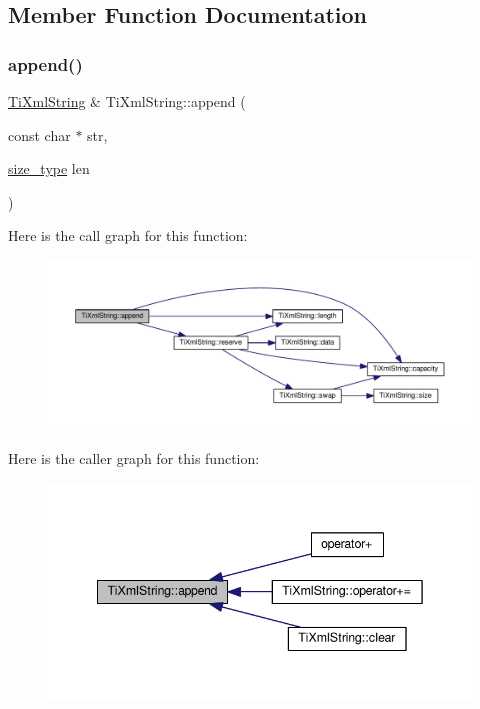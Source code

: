 \subsection{Member Function Documentation}
\mbox{\label{class_ti_xml_string_ad44b21700d2ec24a511367b222b643fb}} 
\subsubsection{\texorpdfstring{append()}{append()}}
{\footnotesize\ttfamily \hyperlink{class_ti_xml_string}{Ti\+Xml\+String} \& Ti\+Xml\+String\+::append (\begin{DoxyParamCaption}\item[{const char $\ast$}]{str,  }\item[{\hyperlink{class_ti_xml_string_abeb2c1893a04c17904f7c06546d0b971}{size\+\_\+type}}]{len }\end{DoxyParamCaption})}

Here is the call graph for this function\+:\nopagebreak
\begin{figure}[H]
\begin{center}
\leavevmode
\includegraphics[width=350pt]{class_ti_xml_string_ad44b21700d2ec24a511367b222b643fb_cgraph}
\end{center}
\end{figure}
Here is the caller graph for this function\+:\nopagebreak
\begin{figure}[H]
\begin{center}
\leavevmode
\includegraphics[width=342pt]{class_ti_xml_string_ad44b21700d2ec24a511367b222b643fb_icgraph}
\end{center}
\end{figure}
\mbox{\label{class_ti_xml_string_ac72f3d9149b7812c1e6c59402014d0d5}} 

